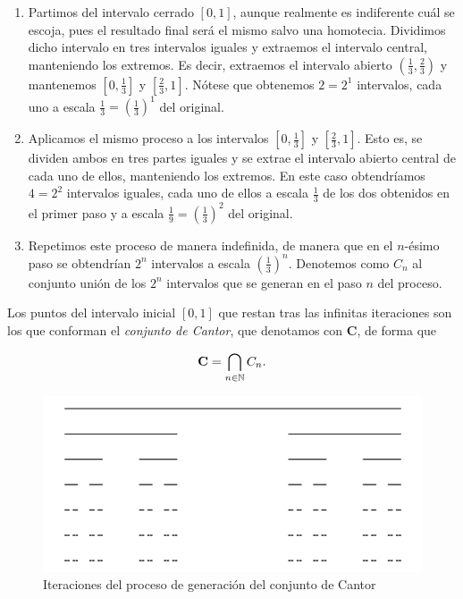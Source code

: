 \begin{enumerate}
\item Partimos del intervalo cerrado $[0,1]$, aunque realmente es indiferente cuál se escoja, pues el resultado final será el mismo salvo una homotecia. Dividimos dicho intervalo en tres intervalos iguales y extraemos el intervalo central, manteniendo los extremos. Es decir, extraemos el intervalo abierto $\left(\frac 1 3, \frac 2 3\right)$ y mantenemos $\left[0,\frac 1 3\right]$ y $\left[\frac 2 3, 1\right]$. Nótese que obtenemos $2=2^1$ intervalos, cada uno a escala $\frac 1 3=\left(\frac 1 3\right)^1$ del original.

\item Aplicamos el mismo proceso a los intervalos $\left[0,\frac 1 3\right]$ y $\left[\frac 2 3, 1\right]$. Esto es, se dividen ambos en tres partes iguales y se extrae el intervalo abierto central de cada uno de ellos, manteniendo los extremos. En este caso obtendríamos $4=2^2$ intervalos iguales, cada uno de ellos a escala $\frac 1 3$ de los dos obtenidos en el primer paso y a escala $\frac 1 9=\left(\frac 1 3\right)^2$ del original.

\item Repetimos este proceso de manera indefinida, de manera que en el $n$-ésimo paso se obtendrían $2^n$ intervalos a escala $\left(\frac 1 3\right)^n$. Denotemos como $C_n$ al conjunto unión de los $2^n$ intervalos que se generan en el paso $n$ del proceso.
\end{enumerate} 

Los puntos del intervalo inicial $[0,1]$ que restan tras las infinitas iteraciones son los que conforman el \textit{conjunto de Cantor}, que denotamos con $\mathbf{C}$, de forma que 

$$\mathbf{C}=\bigcap_{n\in\mathbb{N}}C_n.$$

\begin{figure} [ht]
\centering
\includegraphics[scale = 0.6]{img/cantor.png}
\caption{Iteraciones del proceso de generación del conjunto de Cantor}
 \label{fig:Cantor}
\end{figure}

